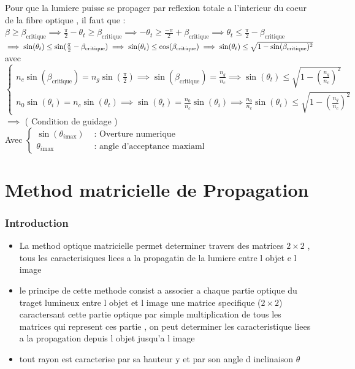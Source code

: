 \documentclass[12pt]{book}
\begin{document}
            Pour que la lumiere puisse se propager par reflexion totale a l'interieur du coeur de la fibre optique , il faut que :\\
            $ \beta \geq \beta_{\text{critique}} \implies \frac{\pi}{2}-\theta_t \geq \beta_{\text{critique}} \implies -\theta_t \geq \frac{-\pi}{2} +\beta_{\text{critique}} \implies \theta_t \leq \frac{\pi}{2}-\beta_{\text{critique}}$\\
            $ \implies \sin(\theta_t) \leq \sin(\frac{\pi}{2} - \beta_{\text{critique}}) \implies \sin(\theta_t)\leq\cos(\beta_{\text{critique}}) \\
            \implies \sin(\theta_t)\leq\sqrt{1-\sin(\beta_{\text{critique}})^2}$ \\
            avec $ \begin{cases}
                n_c\sin(\beta_{\text{critique}}) = n_g\sin(\frac{\pi}{2})\implies \sin(\beta_{\text{critique}})=\frac{n_g}{n_c}\implies \sin(\theta_t)\leq\sqrt{1-(\frac{n_g}{n_c})^2}\\
                n_0\sin(\theta_i)=n_c\sin(\theta_t)\implies \sin(\theta_t) = \frac{n_0}{n_c}\sin(\theta_i)\implies \frac{n_0}{n_c}\sin(\theta_i)\leq\sqrt{1-(\frac{n_g}{n_c})^2}
            \end{cases}$ \\
            $ \implies$   ( Condition de guidage ) \\
            Avec $ \begin{cases}
                \sin(\theta_{i\text{max}}) &\text{ : Overture numerique} \\
                \theta_{i\text{max}} & \text{ : angle d'acceptance maxiaml} 
            \end{cases} $
            


    \chapter{Method matricielle de Propagation }
        \subsection{Introduction}
            \begin{itemize}
                \item La method optique matricielle permet determiner travers des matrices $2 \times 2$ , tous les caracterisiques liees a la propagatin de la lumiere entre l objet e l image
                \item le principe de cette methode consist a associer a chaque partie optique du traget lumineux entre l objet et l image une matrice specifique ($2 \times 2$) caractersant cette partie optique par simple multiplication de tous les matrices qui represent ces partie , on peut determiner les caracteristique liees a la propagation depuis l objet jusqu'a l image 
                \item tout rayon est caracterise par sa hauteur y et par son angle d inclinaison $\theta$ 
                  
            \end{itemize}
\end{document}
